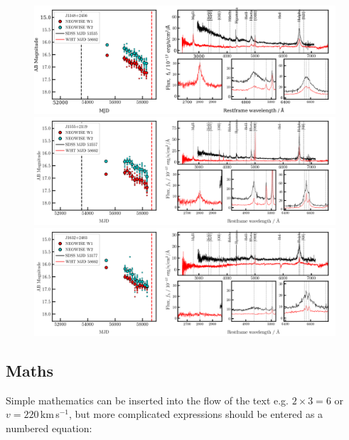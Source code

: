 \documentclass[a4paper,fleqn,usenatbib]{mnras}
\begin{document}
 \begin{figure}
  \centering
  \includegraphics[width=16.7cm, trim=0.0cm 0.05cm 0.2cm 0.1cm, clip]
  {../plots/LCs_and_spectra/J1348+2456_landscape_temp.png}
  \includegraphics[width=16.7cm, trim=0.0cm 0.05cm 0.2cm 0.1cm, clip]
  {../plots/LCs_and_spectra/J1555+2119_landscape_temp.png}
  \includegraphics[width=16.7cm, trim=0.0cm 0.0cm  0.2cm 0.1cm, clip]
  {../plots/LCs_and_spectra/J1634+1118_landscape_temp.png}
  \vspace{-12pt}
  \caption[]{}
  \label{fig:risers}
\end{figure}


\subsection{Maths}
\label{sec:maths} %

Simple mathematics can be inserted into the flow of the text e.g. $2\times3=6$
or $v=220$\,km\,s$^{-1}$, but more complicated expressions should be entered
as a numbered equation:
\end{document}
